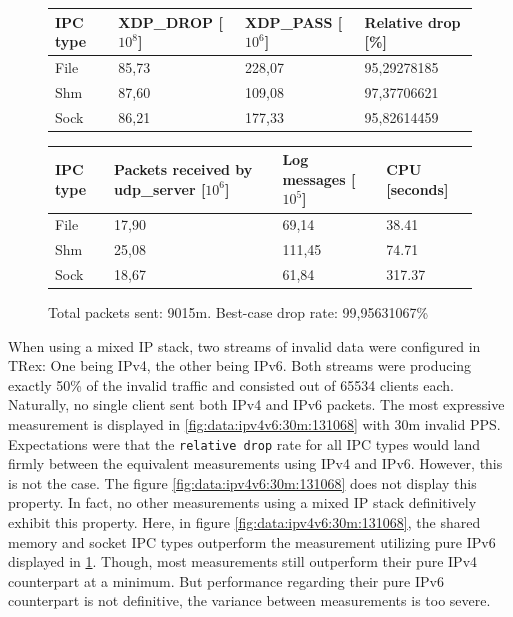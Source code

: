 \begin{figure}[!h]
	\centering
	\scriptsize
	\begin{tabular}{llll}
		\toprule
		\textbf{IPC type} & \textbf{XDP\_DROP [$10^8$]} & \textbf{XDP\_PASS [$10^6$]} & \textbf{Relative drop [\%]} \\ \midrule 
		File & 85,73 & 228,07 & 95,29278185 \\
        Shm & 87,60 & 109,08 & 97,37706621 \\
        Sock & 86,21 & 177,33 & 95,82614459 \\
	\bottomrule
	\end{tabular}
    \begin{tabular}{llll}
		\toprule
		\textbf{IPC type} & \textbf{Packets received by udp\_server [$10^6$]} & \textbf{Log messages [$10^5$]} & \textbf{CPU [seconds]} \\ \midrule 
		File & 17,90 & 69,14 & 38.41 \\
        Shm & 25,08 & 111,45 & 74.71 \\
        Sock & 18,67 & 61,84 & 317.37 \\
	\bottomrule
	\end{tabular}
	\caption[Simplefail2ban, IPv6, 30m \ac{PPS}, 131068 malicious clients]{Total packets sent: 9015m. Best-case drop rate: 99,95631067\%}
	\label{fig:data:ipv6:30m:131068}
\end{figure}

When using a mixed \ac{IP} stack, two streams of invalid data were configured in TRex: One being IPv4, the other being IPv6.
Both streams were producing exactly 50\% of the invalid traffic and consisted out of 65534 clients each.
Naturally, no single client sent both IPv4 and IPv6 packets.
The most expressive measurement is displayed in \ref{fig:data:ipv4v6:30m:131068} with 30m invalid \ac{PPS}.
Expectations were that the \texttt{relative drop} rate for all \ac{IPC} types would land firmly between the equivalent measurements using IPv4 and IPv6.
However, this is not the case.
The figure \ref{fig:data:ipv4v6:30m:131068} does not display this property.
In fact, no other measurements using a mixed \ac{IP} stack definitively exhibit this property.
Here, in figure \ref{fig:data:ipv4v6:30m:131068}, the shared memory and socket \ac{IPC} types outperform the measurement utilizing pure IPv6 displayed in \ref{fig:data:ipv6:30m:131068}.
Though, most measurements still outperform their pure IPv4 counterpart at a minimum.
But performance regarding their pure IPv6 counterpart is not definitive, the variance between measurements is too severe.

